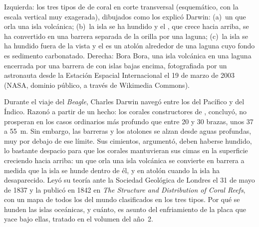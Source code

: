 \begin{omfigure}
{\small Izquierda: los tres tipos de  de coral en corte transversal (esquemático, con la escala vertical muy exagerada), dibujados como los explicó Darwin: (a)~un 
que orla una isla volcánica; (b)~la isla se ha hundido y el , que crece hacia arriba, se ha convertido en una barrera separada de la orilla por una laguna; (c)~la isla se ha
hundido fuera de la vista y el  es un atolón alrededor de una laguna cuyo fondo es sedimento carbonatado. Derecha: Bora Bora, una isla volcánica en una laguna encerrada por una
barrera de  con islas bajas encima, fotografiada por un astronauta desde la Estación Espacial Internacional el 19 de marzo de 2003 (NASA, dominio público, a través de
Wikimedia Commons).}
\label{fig:b1:chemical-biogenic-sediments:reefs}
\end{omfigure}

\begin{history}
Durante el viaje del \emph{Beagle}, Charles Darwin navegó entre los  del Pacífico y del Índico. Razonó a partir de un hecho: los corales constructores de , concluyó,
no prosperan en los casos ordinarios más profundo que entre 20 y 30 brazas, unos 37 a \qty{55}{m}. Sin embargo, las barreras y los atolones se alzan desde aguas profundas, muy por
debajo de ese límite. Sus cimientos, argumentó, deben haberse hundido, lo bastante despacio para que los corales mantuvieran sus cimas en la superficie creciendo hacia arriba: un
 que orla una isla volcánica se convierte en barrera a medida que la isla se hunde dentro de él, y en atolón cuando la isla ha desaparecido. Leyó su teoría ante la Sociedad
Geológica de Londres el 31 de mayo de 1837 y la publicó en 1842 en \emph{The Structure and Distribution of Coral Reefs}, con un mapa de todos los  del mundo clasificados en los tres
tipos. Por qué se hunden las islas oceánicas, y cuánto, es asunto del enfriamiento de la placa que yace bajo ellas, tratado en el volumen del año~2.
\end{history}

